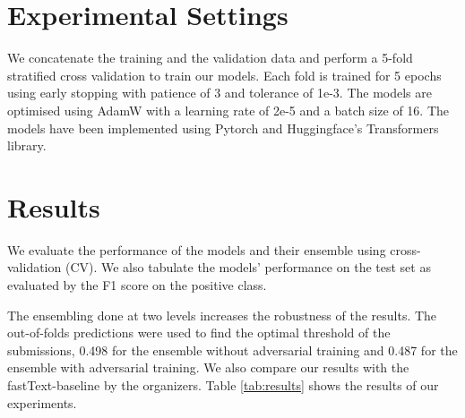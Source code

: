 \documentclass[11pt,a4paper]{article}
\begin{document}
\section{Experimental Settings}
\label{sec:exp_set}
We concatenate the training and the validation data and perform a 5-fold stratified cross validation to train our models. Each fold is trained for 5 epochs using early stopping with patience of 3 and tolerance of 1e-3. The models are optimised using AdamW \citep{DBLP:journals/corr/abs-1711-05101} with a learning rate of 2e-5 and a batch size of 16. The models have been implemented using Pytorch \citep{paszke2019pytorch} and Huggingface's Transformers \citep{wolf2019transformers} library.

\section{Results}
\label{sec:results}

We evaluate the performance of the models and their ensemble using cross-validation (CV). We also tabulate the models' performance on the test set as evaluated by the F1 score on the positive class. 



The ensembling done at two levels increases the robustness of the results. The out-of-folds predictions were used to find the optimal threshold of the submissions, 0.498 for the ensemble without adversarial training and 0.487 for the ensemble with adversarial training. We also compare our results with the fastText-baseline \citep{joulin2016bag} by the organizers. Table \ref{tab:results} shows the results of our experiments.
\end{document}

